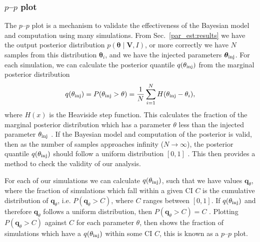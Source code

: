 \subsubsection{\label{par_est:results:simulations:ppplot}$p$--$p$ plot}

The $p$--$p$ plot is a
mechanism to validate the effectiveness of the Bayesian model and computation
using many simulations.  From Sec.~\ref{par_est:results} we have the output
posterior distribution $p(\bm{\theta} \mid \bm{V}, I)$, or more correctly we
have $N$ samples from this distribution $\bm{\theta}_i$, and we have the
injected parameters $\bm{\theta}_{\rm{inj}}$.  For each simulation, we can
calculate the posterior quantile $q(\theta_{\rm{inj}})$ from the marginal
posterior distribution
%
\begin{equation}
    q(\theta_{\rm{inj}}) = P(\theta_{\rm{inj}} > \theta) = \frac{1}{N} \sum_{i=1}^{N} H(\theta_{\rm{inj}} - \theta_i),
\end{equation}
%
where $H(x)$ is the Heaviside step function.  This calculates the fraction of
the marginal posterior distribution which has a parameter $\theta$ less than
the injected parameter $\theta_{\rm{inj}}$ \citep{cook2006ValidationSoftware}.
If the Bayesian model and computation of the posterior is valid, then as the
number of samples approaches infinity ($N \rightarrow \infty$), the posterior
quantile $q(\theta_{\rm{inj}})$ should follow a uniform distribution $[0,1]$
\citep{cook2006ValidationSoftware}.  This then provides a method to check the
validity of our analysis.

For each of our simulations we can calculate $q(\theta_{\rm{inj}})$, such that
we have values $\bm{q}_{\theta}$, where the fraction of simulations which fall
within a given \gls{CI} $C$ is the cumulative distribution of
$\bm{q}_{\theta}$, i.e. $P(\bm{q}_{\theta} > C)$, where $C$ ranges between
$[0,1]$.  If $q(\theta_{\rm{inj}})$ and therefore $\bm{q}_{\theta}$ follows a
uniform distribution, then $P(\bm{q}_{\theta} > C) = C$ \citep{cook2006ValidationSoftware}.
Plotting $P(\bm{q}_{\theta} > C)$ against $C$ for each parameter $\theta$, then
shows the fraction of simulations which have a $q(\theta_{\rm{inj}})$ within
some \gls{CI} $C$, this is known as a $p$--$p$ plot.

